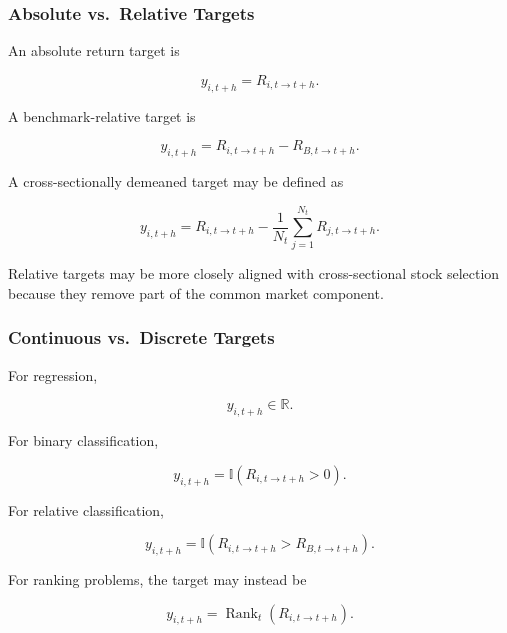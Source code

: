\documentclass[11pt,a4paper]{article}
\begin{document}
\subsubsection{Absolute vs.\ Relative Targets}

An absolute return target is

\begin{equation}
y_{i,t+h}
=
R_{i,t\rightarrow t+h}.
\end{equation}

A benchmark-relative target is

\begin{equation}
\boxed{
y_{i,t+h}
=
R_{i,t\rightarrow t+h}
-
R_{B,t\rightarrow t+h}.
}
\end{equation}

A cross-sectionally demeaned target may be defined as

\begin{equation}
y_{i,t+h}
=
R_{i,t\rightarrow t+h}
-
\frac{1}{N_t}
\sum_{j=1}^{N_t}
R_{j,t\rightarrow t+h}.
\end{equation}

Relative targets may be more closely aligned with cross-sectional stock
selection because they remove part of the common market component.


\subsubsection{Continuous vs.\ Discrete Targets}

For regression,

\begin{equation}
y_{i,t+h}
\in
\mathbb{R}.
\end{equation}

For binary classification,

\begin{equation}
y_{i,t+h}
=
\mathbb{I}
\left(
R_{i,t\rightarrow t+h}>0
\right).
\end{equation}

For relative classification,

\begin{equation}
y_{i,t+h}
=
\mathbb{I}
\left(
R_{i,t\rightarrow t+h}
>
R_{B,t\rightarrow t+h}
\right).
\end{equation}

For ranking problems, the target may instead be

\begin{equation}
y_{i,t+h}
=
\operatorname{Rank}_t
\left(
R_{i,t\rightarrow t+h}
\right).
\end{equation}
\end{document}
